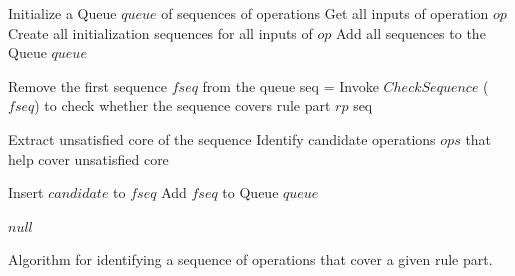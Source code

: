 

\begin{algorithm}[t]
\SetAlgoVlined
\footnotesize
{}
\BlankLine

\nl Initialize a Queue $queue$ of sequences of operations\;
\nl Get all inputs of operation $op$\;
\nl Create all initialization sequences for all inputs of $op$\;
\nl Add all sequences to the Queue $queue$\;

\nl {}
{
		\nl Remove the first sequence $fseq$ from the queue\;
		\nl seq = Invoke $CheckSequence$ ($fseq$) to check whether the sequence covers rule part $rp$\;
		\nl {}
		{
				\Return seq\;
		}
		
		\nl Extract unsatisfied core of the sequence\;
		\nl Identify candidate operations $ops$ that help cover unsatisfied core\;
		
		{
			\nl Insert $candidate$ to $fseq$\;
			\nl Add $fseq$ to Queue $queue$\;			
		}
}

\Return $null$\;
		
\caption{\label{alg:guidedsearch} Algorithm  for
  identifying a sequence of operations that cover a given rule part.}
\end{algorithm}



